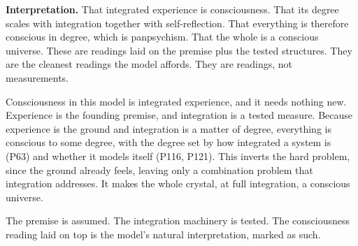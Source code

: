 \textbf{Interpretation.} That integrated experience is consciousness. That its degree scales with integration together with self-reflection. That everything is therefore conscious in degree, which is panpsychism. That the whole is a conscious universe. These are readings laid on the premise plus the tested structures. They are the cleanest readings the model affords. They are readings, not measurements.

Consciousness in this model is integrated experience, and it needs nothing new. Experience is the founding premise, and integration is a tested measure. Because experience is the ground and integration is a matter of degree, everything is conscious to some degree, with the degree set by how integrated a system is (P63) and whether it models itself (P116, P121). This inverts the hard problem, since the ground already feels, leaving only a combination problem that integration addresses. It makes the whole crystal, at full integration, a conscious universe.

The premise is assumed. The integration machinery is tested. The consciousness reading laid on top is the model's natural interpretation, marked as such.
